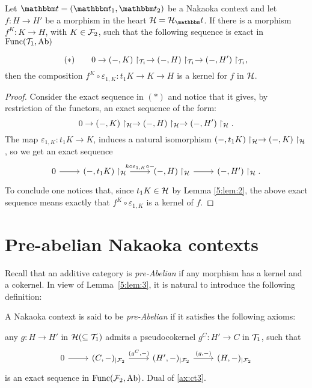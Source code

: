 \begin{lemma}\label{5:lem:3}
Let $\t=(\t_1,\t_2)$ be a Nakaoka context and let $f\colon H\to H'$ be a morphism in the heart $\clH=\clH_\t$. If there is a morphism $f^K\colon K\to H$, with $K\in \mathcal{F}_2$, such that the following sequence is exact in $\mathrm{Func}(\mathcal{T}_1, \mathrm{Ab})$

\begin{equation*}
(*)\qquad 0\to (-,K)\restriction_{\mathcal{T}_1}\to (-,H)\restriction_{\mathcal{T}_1}\to (-,H')\restriction_{\mathcal{T}_1},
\end{equation*}
then the composition $f^K\circ \varepsilon_{1,K}\colon t_1K\to K\to H$ is a kernel for $f$ in $\mathcal{H}$.
\end{lemma}
\begin{proof}
Consider the exact sequence in $(*)$ and notice that it gives, by restriction of the functors, an exact sequence of the form:
\begin{equation*}
0\to (-,K)\restriction_{\mathcal{H}}\to (-,H)\restriction_{\mathcal{H}}\to (-,H')\restriction_{\mathcal{H}}.
\end{equation*}
The map $\varepsilon_{1,K}\colon t_1K\to K$, induces a natural isomorphism $(-,t_1K)\restriction_{\mathcal{H}} \to (-,K)\restriction_{\mathcal{H}}$, so we get an exact sequence
\begin{equation*}
\begin{tikzcd}
  0\arrow{r}
  & (-,t_1K)\restriction_{\clH}\arrow{r}{k\circ \varepsilon_{1,K}\circ -}
  & (-,H)\restriction_{\clH}\arrow{r}
  & (-,H')\restriction_{\clH}.
\end{tikzcd}
\end{equation*}
To conclude one notices that, since $t_1K\in\mathcal{H}$ by Lemma \ref{5:lem:2}, the above exact sequence means exactly that $f^K\circ \varepsilon_{1,K}$ is a kernel of $f$.
\end{proof}


\section{Pre-abelian Nakaoka contexts}
Recall that an additive category is  \emph{pre-Abelian} if any morphism has a kernel and a cokernel. In view of Lemma~\ref{5:lem:3}, it is natural to introduce the following definition:

\begin{definition}
A Nakaoka context is said to be \emph{pre-Abelian} if it satisfies the following axioms:
\begin{torsionaxioms}\setcounter{enumi}{2}
\item\label{ax:ct3} any  $g\colon H\to H'$ in $\mathcal{H}(\subseteq \mathcal{T}_1)$ admits a pseudocokernel $g^C\colon H'\to C$ in $\mathcal{T}_1$, such that
\begin{equation*}
\begin{tikzcd}
0\arrow{r} &(C,-)_{|\F_2}\arrow{r}{(g^C,-)} & (H',-)_{|\F_2}\arrow{r}{(g,-)}& (H,-)_{|\F_2}
\end{tikzcd}
\end{equation*}
is an exact sequence in $\mathrm{Func}(\mathcal{F}_2,\mathrm{Ab})$.
\varitem{^\ast}\label{ax:ct3op} Dual of \ref{ax:ct3}.
\end{torsionaxioms}
\end{definition}

